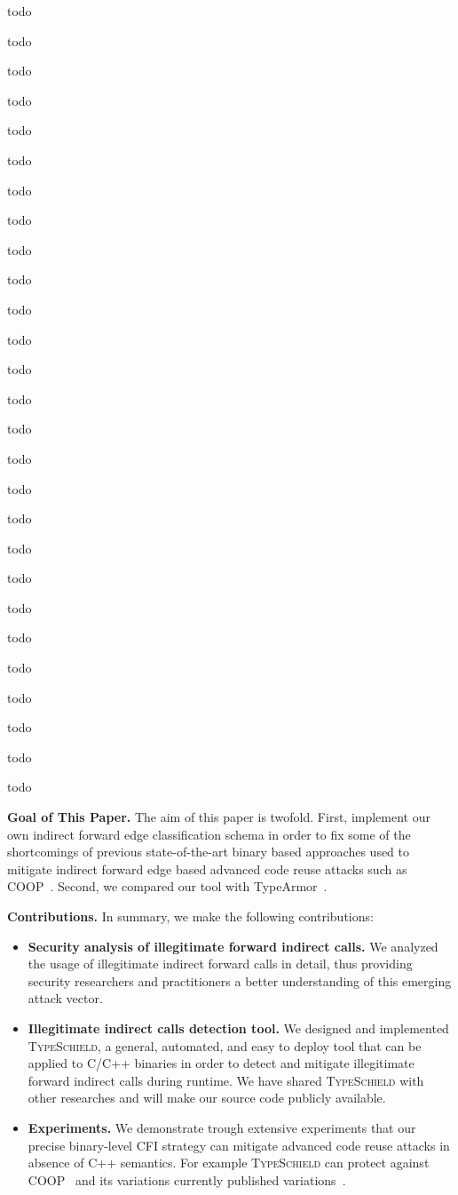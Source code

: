 todo

todo


todo


todo

todo

todo

todo

todo


todo


todo

todo


todo

todo

todo


todo


todo

todo

todo

todo

todo


todo

todo

todo

todo

todo

todo

todo

\textbf{Goal of This Paper.} The aim of this paper is twofold. First, implement our own indirect forward edge 
classification schema in order to fix some of the shortcomings of previous state-of-the-art binary based approaches
used to mitigate indirect forward edge based advanced code reuse attacks such as COOP~\cite{schuster:coop}.
Second, we compared our tool with TypeArmor~\cite{veen:typearmor}.

\textbf{Contributions.} In summary, we make the following contributions:
\label{Contribution}
\begin{itemize}
 \item \textbf{Security analysis of illegitimate forward indirect calls.} 
 We analyzed the usage of illegitimate indirect forward calls in detail,
 thus providing security researchers and
practitioners a better understanding of this emerging
attack vector.

 \item \textbf{Illegitimate indirect calls detection tool.}
 We designed and implemented \textsc{TypeSchield}, a general, automated, and easy to deploy tool
 that can be applied to C/C++ binaries in order to detect and mitigate illegitimate forward indirect calls 
 during runtime. We have shared \textsc{TypeSchield} with other researches and will make our source code 
 publicly available.
 
 \item \textbf{Experiments.} We demonstrate trough extensive experiments that our precise
 binary-level CFI strategy can mitigate advanced code reuse attacks in absence of C++ semantics.
 For example \textsc{TypeSchield} can protect against COOP~\cite{schuster:coop} and its variations currently published 
 variations~\cite{loop:oriented, crane:readactor++, subversive-c:lettner}.
  
\end{itemize}

